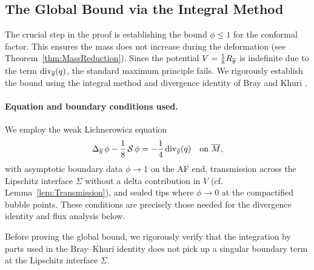 \subsection{The Global Bound via the Integral Method}
\label{sec:GlobalBound}

The crucial step in the proof is establishing the bound $\phi \le 1$ for the conformal factor. This ensures the mass does not increase during the deformation (see Theorem~\ref{thm:MassReduction}). Since the potential $V = \frac{1}{8}R_{\overline{g}}$ is indefinite due to the term $\mathrm{div}_{\overline{g}}(q)$, the standard maximum principle fails. We rigorously establish the bound using the integral method and divergence identity of Bray and Khuri \cite{braykhuri2010}.

\paragraph{Equation and boundary conditions used.}
We employ the weak Lichnerowicz equation
\begin{equation}\label{eq:LichWeak}
    \Delta_{\overline{g}}\,\phi - \frac{1}{8}\,\mathcal{S}\,\phi = -\frac{1}{4}\,\mathrm{div}_{\overline{g}}(q)\quad\text{on }\overline{M},
\end{equation}
with asymptotic boundary data $\phi\to 1$ on the AF end, transmission across the Lipschitz interface $\Sigma$ without a delta contribution in $V$ (cf. Lemma~\ref{lem:Transmission}), and sealed tips where $\phi\to 0$ at the compactified bubble points. These conditions are precisely those needed for the divergence identity and flux analysis below.

Before proving the global bound, we rigorously verify that the integration by parts used in the Bray--Khuri identity does not pick up a singular boundary term at the Lipschitz interface $\Sigma$.

